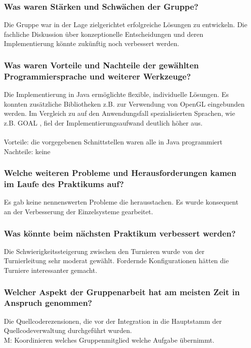 \documentclass[runningheads]{llncs}
\begin{document}
\subsubsection{Was waren Stärken und Schwächen der Gruppe?\\}
Die Gruppe war in der Lage zielgerichtet erfolgreiche Lösungen zu entwickeln. Die fachliche Diskussion über konzeptionelle Entscheidungen und deren Implementierung könnte zukünftig noch verbessert werden.   

\subsubsection{Was waren Vorteile und Nachteile der gewählten Programmiersprache und weiterer Werkzeuge?\\}
Die Implementierung in Java ermöglichte flexible, individuelle Lösungen. Es konnten zusätzliche Bibliotheken z.B. zur Verwendung von OpenGL eingebunden werden. Im Vergleich zu auf den Anwendungsfall spezialisierten Sprachen, wie z.B. GOAL \cite{Goal}, fiel der Implementierungsaufwand deutlich höher aus.
\\ 
\\
Vorteile: die vorgegebenen Schnittstellen waren alle in Java programmiert\\
Nachteile: keine
\subsubsection{Welche weiteren Probleme und Herausforderungen kamen im Laufe des Praktikums auf?\\}
Es gab keine nennenswerten Probleme die herausstachen. Es wurde konsequent an der Verbesserung der Einzelsysteme gearbeitet. 
\subsubsection{Was könnte beim nächsten Praktikum verbessert werden?\\}
Die Schwierigkeitssteigerung zwischen den Turnieren wurde von der Turnierleitung sehr moderat gewählt. Fordernde Konfigurationen hätten die Turniere interessanter gemacht.
\subsubsection{Welcher Aspekt der Gruppenarbeit hat am meisten Zeit in Anspruch genommen?\\}
Die Quellcoderezensionen, die vor der Integration in die Hauptstamm der Quellcodeverwaltung durchgeführt wurden. 
\\
M: Koordinieren welches Gruppenmitglied welche Aufgabe übernimmt.
\end{document}
